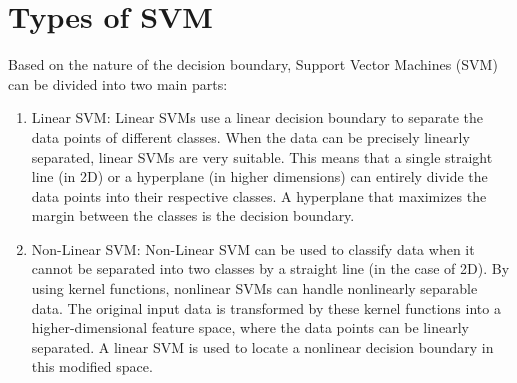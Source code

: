 \documentclass[12pt,a4paper]{report}
\begin{document}
\section*{Types of SVM}
Based on the nature of the decision boundary, Support Vector Machines (SVM) can be divided into two main parts:
\begin{enumerate}
    

\item Linear SVM: Linear SVMs use a linear decision boundary to separate the data points of different classes. When the data can be precisely linearly separated, linear SVMs are very suitable. This means that a single straight line (in 2D) or a hyperplane (in higher dimensions) can entirely divide the data points into their respective classes. A hyperplane that maximizes the margin between the classes is the decision boundary.
\newpage
\item Non-Linear SVM: Non-Linear SVM can be used to classify data when it cannot be separated into two classes by a straight line (in the case of 2D). By using kernel functions, nonlinear SVMs can handle nonlinearly separable data. The original input data is transformed by these kernel functions into a higher-dimensional feature space, where the data points can be linearly separated. A linear SVM is used to locate a nonlinear decision boundary in this modified space.
\end{enumerate}
\end{document}
